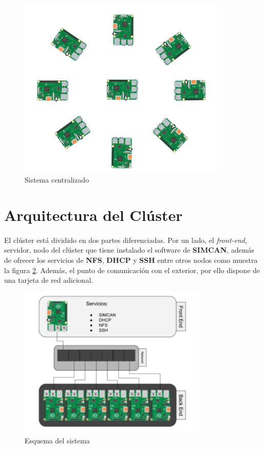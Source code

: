 \begin{figure}[H]
	\centering
  	\includegraphics[width=100mm]{pics/centralizado.png}
   	\caption[Sistema centralizado]{Sistema centralizado}
   \label{figure2.6}
\end{figure}

\section{Arquitectura del Clúster}
\label{makereference3.3}
\paragraph{}

El clúster está dividido en dos partes diferenciadas. Por un lado, el \textit{front-end}, servidor, nodo del clúster que tiene instalado el software de \textbf{SIMCAN}, además de ofrecer los servicios de \textbf{NFS}, \textbf{DHCP} y \textbf{SSH} entre otros nodos como muestra la figura \ref{figure3.2}. Además, el punto de comunicación con el exterior, por ello dispone de una tarjeta de red adicional.

\begin{figure}[H]
	\centering
  	\includegraphics[width=90mm]{pics/servidores.PNG}
   	\caption[Esquema]{Esquema del sistema}
   \label{figure3.2}
\end{figure}

